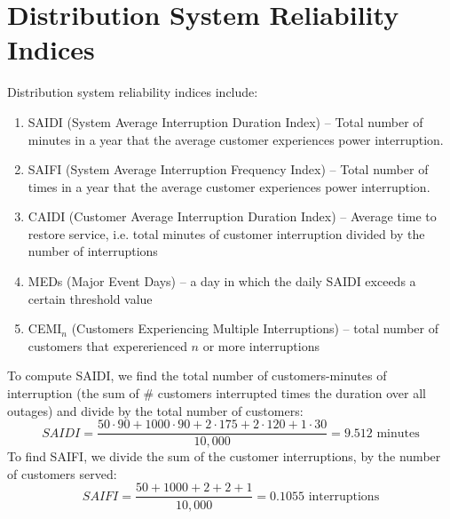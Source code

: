 \documentclass{homework}
\begin{document}
\section{Distribution System Reliability Indices}

\begin{letterenum}
    \item Distribution system reliability indices include:
    \begin{enumerate}
        \item SAIDI (System Average Interruption Duration Index) -- Total number
            of minutes in a year that the average customer experiences power interruption.
        \item SAIFI (System Average Interruption Frequency Index) -- Total number
            of times in a year that the average customer experiences power interruption.
        \item CAIDI (Customer Average Interruption Duration Index) -- Average time
            to restore service, i.e. total minutes of customer interruption divided
            by the number of interruptions
        \item MEDs (Major Event Days) -- a day in which the daily SAIDI exceeds
            a certain threshold value
        \item CEMI$_n$ (Customers Experiencing Multiple Interruptions) -- total
            number of customers that expererienced $n$ or more interruptions
    \end{enumerate}

    \item To compute SAIDI, we find the total number of customers-minutes of interruption
        (the sum of \# customers interrupted times the duration over all outages) and 
        divide by the total number of customers:
        \begin{equation*}
            SAIDI = \frac{50 \cdot 90 + 1000 \cdot 90 + 2 \cdot 175 + 2 \cdot 120 + 1 \cdot 30}{10,000}
                = 9.512 \text{ minutes}
        \end{equation*}
        To find SAIFI, we divide the sum of the customer interruptions, by
        the number of customers served:
        \begin{equation*}
            SAIFI = \frac{50 + 1000 + 2 + 2 + 1}{10,000}
                = 0.1055 \text{ interruptions}
        \end{equation*}
\end{letterenum}
\end{document}
